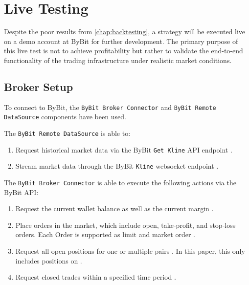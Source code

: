 \section{Live Testing}
\label{chap:live-test}

Despite the poor results from \autoref{chap:backtesting}, a strategy will be executed live on a demo account at ByBit for further development.
The primary purpose of this live test is not to achieve profitability but rather to validate the end-to-end functionality of the trading infrastructure under realistic market conditions.


\subsection{Broker Setup}

To connect to ByBit, the \texttt{ByBit Broker Connector} and \texttt{ByBit Remote DataSource} components have been used.

The \texttt{ByBit Remote DataSource} is able to:

\begin{enumerate}
    \item Request historical market data via the ByBit \texttt{Get Kline} API endpoint \cite{get-kline}.
    \item Stream market data through the ByBit \texttt{Kline} websocket endpoint \cite{stream-kline}.
\end{enumerate}

\noindent
The \texttt{ByBit Broker Connector} is able to execute the following actions via the ByBit API:

\begin{enumerate}
    \item Request the current wallet balance as well as the current margin \cite{wallet-balance}.
    \item Place orders in the market, which include open, take-profit, and stop-loss orders.
    Each Order is supported as limit and market order \cite{place-order}.
    \item Request all open positions for one or multiple pairs \cite{position-info}.
    In this paper, this only includes positions on \ethusdc.
    \item Request closed trades within a specified time period \cite{closed-pnl}.
\end{enumerate}

